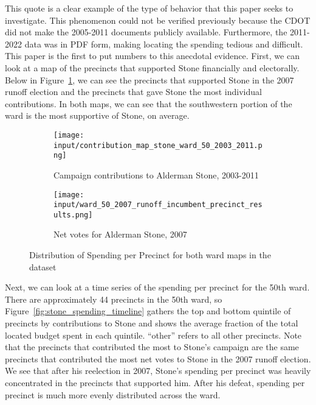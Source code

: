 This quote is a clear example of the type of behavior that this paper seeks to investigate.
This phenomenon could not be verified previously because the CDOT did not make the 2005-2011 documents publicly available. 
Furthermore, the 2011-2022 data was in PDF form, making locating the spending tedious and difficult.
This paper is the first to put numbers to this anecdotal evidence.
First, we can look at a map of the precincts that supported Stone financially and electorally.
Below in Figure~\ref{fig:stone_support_maps}, we can see the precincts that supported Stone in the 2007 runoff election and the precincts that gave Stone the most individual contributions.
In both maps, we can see that the southwestern portion of the ward is the most supportive of Stone, on average.
\begin{figure}[H]
    \centering
    \begin{subfigure}[b]{0.45\textwidth} %
    \texttt{[image: input/contribution\_map\_stone\_ward\_50\_2003\_2011.png]}
    \caption{Campaign contributions to Alderman Stone, 2003-2011}
    \end{subfigure}
    \hfill %
    \begin{subfigure}[b]{0.45\textwidth}
    \texttt{[image: input/ward\_50\_2007\_runoff\_incumbent\_precinct\_results.png]}
    \caption{Net votes for Alderman Stone, 2007}
    \end{subfigure}
    \caption{Distribution of Spending per Precinct for both ward maps in the dataset}
    \label{fig:stone_support_maps}
\end{figure}

Next, we can look at a time series of the spending per precinct for the 50th ward. 
There are approximately 44 precincts in the 50th ward, so Figure~\ref{fig:stone_spending_timeline} gathers the top and bottom quintile of precincts by contributions to Stone and shows the average fraction of the total located budget spent in each quintile. 
``other'' refers to all other precincts.
Note that the precincts that contributed the most to Stone's campaign are the same precincts that contributed the most net votes to Stone in the 2007 runoff election.
We see that after his reelection in 2007, Stone's spending per precinct was heavily concentrated in the precincts that supported him.
After his defeat, spending per precinct is much more evenly distributed across the ward.

